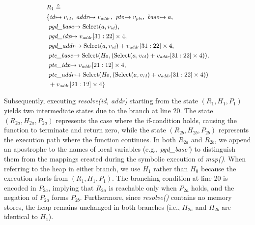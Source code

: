 \begin{equation}
\label{state_1}
\small
\begin{aligned}
& R_1 \triangleq \\
&\{
        \textit{id}\!\mapsto v_{\mathit{id}},\
        \textit{addr}\!\mapsto v_{\mathit{addr}},\
        \textit{pte}\!\mapsto v_{\mathit{pte}},\
        \textit{base}\!\mapsto a,\\
      &\ \textit{pgd\_base}\!\mapsto \text{Select}(a, v_{\mathit{id}}),\\
      &\ \textit{pgd\_idx}\!\mapsto v_{\mathit{addr}}[31:22]  \times 4,\\
      &\ \textit{pgd\_addr}\!\mapsto \text{Select}(a, v_{\mathit{id}}) + v_{\mathit{addr}}[31:22] \times 4,\\
      &\ \textit{pte\_base}\!\mapsto \text{Select}(H_0, (\text{Select}(a, v_{\mathit{id}}) + v_{\mathit{addr}}[31:22] \times 4)),\\
      &\ \textit{pte\_idx}\!\mapsto v_{\mathit{addr}}[21:12] \times 4,\\
      &\ \textit{pte\_addr}\!\mapsto \text{Select}(H_0, (\text{Select}(a, v_{\mathit{id}}) + v_{\mathit{addr}}[31:22] \times 4)) \\
      &\ + v_{\mathit{addr}}[21:12] \times 4 \}
\end{aligned}
\end{equation}

Subsequently, executing  \textit{resolve(id, addr)} starting from the state $(R_1, H_1, P_1)$ yields two intermediate states due to the branch at line 20. The state $(R_{2a}, H_{2a}, P_{2a})$ represents the case where the if-condition holds, causing the function to terminate and return zero, while the state $(R_{2b}, H_{2b}, P_{2b})$ represents the execution path where the function continues. In both $R_{2a}$ and $R_{2b}$, we append an apostrophe to the names of local variables (e.g., \textit{pgd\_base'}) to distinguish them from the mappings created during the symbolic execution of \textit{map()}. When referring to the heap in either branch, we use $H_1$ rather than $H_0$ because the execution starts from $(R_1, H_1, P_1)$. The branching condition at line 20 is encoded in $P_{2a}$, implying that $R_{2a}$ is reachable only when $P_{2a}$ holds, and the negation of $P_{2a}$ forms $P_{2b}$. Furthermore, since \textit{resolve()} contains no memory stores, the heap remains unchanged in both branches (i.e., $H_{2a}$ and $H_{2b}$ are identical to $H_1$).

